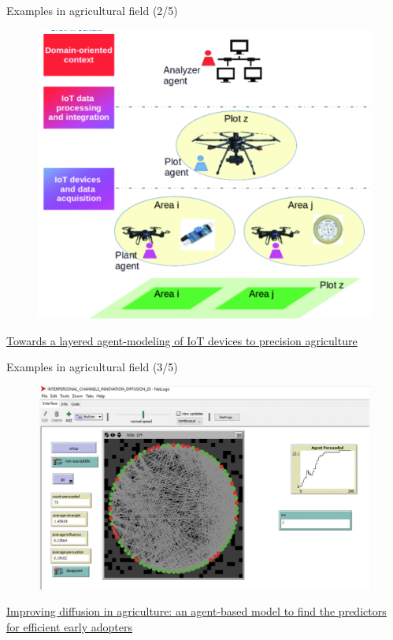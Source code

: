 \documentclass[9pt]{beamer}
\begin{document}
\begin{frame}{Examples in agricultural field (2/5)}

\begin{figure}[H]
\center
\includegraphics[scale=0.32]{agr2.png}
\label{agr2}
\end{figure}

\href{https://ieeexplore.ieee.org/abstract/document/9177771}{Towards a layered agent-modeling of IoT devices to precision agriculture}

\end{frame}

\begin{frame}{Examples in agricultural field (3/5)}

\begin{figure}[H]
\center
\includegraphics[scale=0.25]{agr3.png}
\label{agr3}
\end{figure}

\href{https://link.springer.com/article/10.1186/s40100-019-0121-0}{Improving diffusion in agriculture: an agent-based model to find the predictors for efficient early adopters}

\end{frame}
\end{document}
